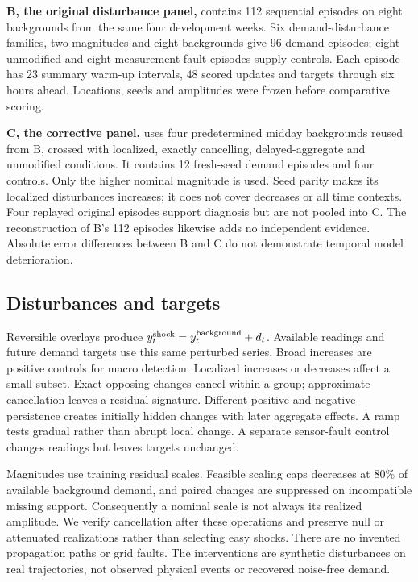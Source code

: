 \documentclass[conference]{IEEEtran}
\begin{document}
\textbf{B, the original disturbance panel,} contains 112 sequential episodes on eight backgrounds from the same four development weeks. Six demand-disturbance families, two magnitudes and eight backgrounds give 96 demand episodes; eight unmodified and eight measurement-fault episodes supply controls. Each episode has 23 summary warm-up intervals, 48 scored updates and targets through six hours ahead. Locations, seeds and amplitudes were frozen before comparative scoring.

\textbf{C, the corrective panel,} uses four predetermined midday backgrounds reused from B, crossed with localized, exactly cancelling, delayed-aggregate and unmodified conditions. It contains 12 fresh-seed demand episodes and four controls. Only the higher nominal magnitude is used. Seed parity makes its localized disturbances increases; it does not cover decreases or all time contexts. Four replayed original episodes support diagnosis but are not pooled into C. The reconstruction of B's 112 episodes likewise adds no independent evidence. Absolute error differences between B and C do not demonstrate temporal model deterioration.

\subsection{Disturbances and targets}
Reversible overlays produce $y^{\rm shock}_t=y^{\rm background}_t+d_t$. Available readings and future demand targets use this same perturbed series. Broad increases are positive controls for macro detection. Localized increases or decreases affect a small subset. Exact opposing changes cancel within a group; approximate cancellation leaves a residual signature. Different positive and negative persistence creates initially hidden changes with later aggregate effects. A ramp tests gradual rather than abrupt local change. A separate sensor-fault control changes readings but leaves targets unchanged.

Magnitudes use training residual scales. Feasible scaling caps decreases at 80\% of available background demand, and paired changes are suppressed on incompatible missing support. Consequently a nominal scale is not always its realized amplitude. We verify cancellation after these operations and preserve null or attenuated realizations rather than selecting easy shocks. There are no invented propagation paths or grid faults. The interventions are synthetic disturbances on real trajectories, not observed physical events or recovered noise-free demand.
\end{document}
